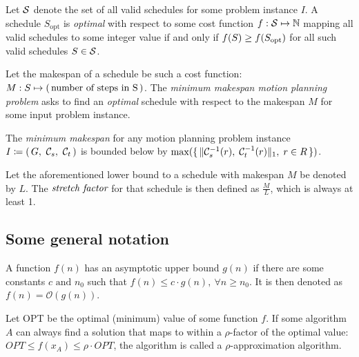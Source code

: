 \begin{definition}\label{def:optimality}
	Let \(\mathcal{S}\) denote the set of all valid schedules for some problem instance \(I\). 
	A schedule \(S_\text{opt}\) is \emph{optimal} with respect to some cost function \(f : \mathcal{S} \mapsto \mathbb{N}\) mapping all valid schedules to some integer value if and only if \(f(S) \geq f(S_\text{opt})\) for all such valid schedules \(S \in \mathcal{S}\).
\end{definition}

\begin{definition}\label{def:m3pp}
	Let the makespan of a schedule be such a cost function: \(M : S \mapsto (\, \text{number of steps in S} \,)\). 
	The \emph{minimum makespan motion planning problem} asks to find an \emph{optimal} schedule with respect to the makespan \(M\) for some input problem instance.
\end{definition}

\begin{remark}
	The \emph{minimum makespan} for any motion planning problem instance \(I \coloneqq \parens{G,\ \conf{s},\ \conf{t}}\) is bounded below by \(\max(\set{\lVert\ensuremath{\mathcal{C}_{s}}^{-1}(r), \; \ensuremath{\mathcal{C}_{t}}^{-1}(r)\rVert_1, \; r \in R})\).
\end{remark}

\begin{definition}
	Let the aforementioned lower bound to a schedule with makespan \(M\) be denoted by \(L\). 
	The \(\emph{stretch factor}\) for that schedule is then defined as \(\frac{M}{L}\), which is always at least 1. 
\end{definition}

\subsection{Some general notation}

\begin{definition}
	A function \(f(n)\) has an asymptotic upper bound \(g(n)\) if there are some constants \(c \text{ and } n_0\) such that \(f(n) \leq c\cdot g(n),\ \forall n \geq n_0\). 
	It is then denoted as \(f(n) = \mathcal{O}(g(n))\). 
\end{definition}


Let OPT be the optimal (minimum) value of some function \(f\). 
If some algorithm \(A\) can always find a solution that maps to within a \(\rho\)-factor of the optimal value: \(OPT \leq f(x_A) \leq \rho \cdot OPT\), the algorithm is called a \(\rho\)-approximation algorithm. 
